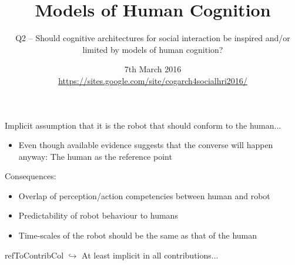 \documentclass[compress]{beamer}
\title{Models of Human Cognition}
\subtitle{Q2 -- Should cognitive architectures for social interaction be
inspired and/or limited by models of human cognition?}
\date{7th March 2016\\ {\tiny \url{https://sites.google.com/site/cogarch4socialhri2016/}}}
\author{}
\institute{\texttt{[image: plymouth-logo]}}
\newcommand{\refToContrib}[1]{%
    \begin{beamercolorbox}[wd=\linewidth,ht=2ex,dp=0.7ex]{refToContribCol}%
    \hspace{0.5em}$\hookrightarrow$ #1%
    \end{beamercolorbox}%
}%
\begin{document}

\maketitle



\begin{frame}{}

	Implicit assumption that it is the robot that should conform to the human...
	
	\begin{itemize}
        \item Even though available evidence suggests that the converse will happen anyway: The human as the reference point
    \end{itemize}
    
    Consequences:
    
    \begin{itemize}
	
	\item<2-> Overlap of perception/action competencies between human and robot 
	
	\item<3-> Predictability of robot behaviour to humans 
	
	\item<4-> Time-scales of the robot should be the same as that of the human 
	
	\end{itemize}
	
	\refToContrib{At least implicit in all contributions...}

\end{frame}
\end{document}
